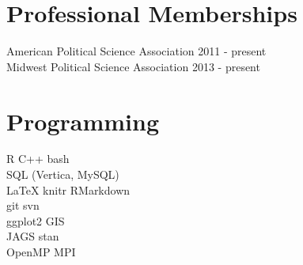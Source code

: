\documentclass[]{deedy-resume-openfont}
\begin{document}
\section{Professional Memberships}
American Political Science Association \hfill 2011 - present\\
Midwest Political Science Association \hfill 2013 - present\\
\sectionsep


\section{Programming}
	\quad R \textbullet{} C++ \textbullet{} bash \\
	\quad SQL (Vertica, MySQL)\\
	\quad \LaTeX \textbullet{} knitr \textbullet{} RMarkdown\\
	\quad git\textbullet{} svn\\
	\quad ggplot2\textbullet{} GIS\\
	\quad JAGS\textbullet{} stan\\
	\quad OpenMP\textbullet{} MPI
\sectionsep
\end{document}
